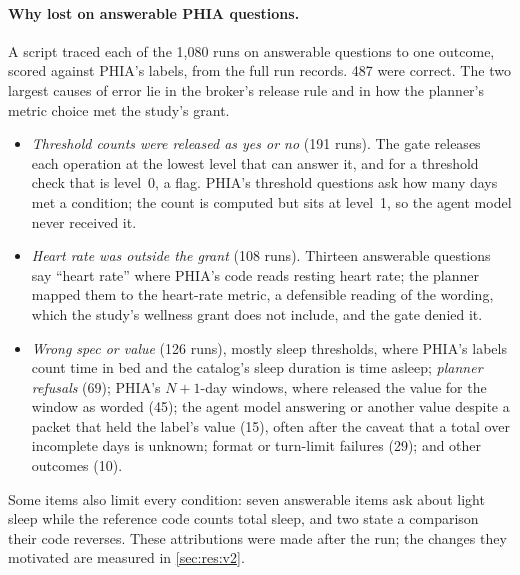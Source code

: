 \paragraph{Why \sys{} lost on answerable PHIA questions.} A script traced each of the 1{,}080 \CC{} runs on
answerable questions to one outcome, scored against PHIA's labels, from the full run records. 487 were correct. The two largest causes of
error lie in the broker's release rule and in how the planner's metric choice met the study's grant.
\begin{itemize}[nosep,leftmargin=*]
\item \emph{Threshold counts were released as yes or no} (191 runs). The gate releases each operation at the lowest
level that can answer it, and for a threshold check that is level~0, a flag. PHIA's threshold questions ask how many
days met a condition; the count is computed but sits at level~1, so the agent model never received it.
\item \emph{Heart rate was outside the grant} (108 runs). Thirteen answerable questions say ``heart rate'' where
PHIA's code reads resting heart rate; the planner mapped them to the heart-rate metric, a defensible reading of the
wording, which the study's wellness grant does not include, and the gate denied it.
\item \emph{Wrong spec or value} (126 runs), mostly sleep thresholds, where PHIA's labels count time in bed and the
catalog's sleep duration is time asleep; \emph{planner refusals} (69); PHIA's $N{+}1$-day windows, where \CC{}
released the value for the window as worded (45); the agent model answering  or another value despite
a packet that held the label's value (15), often after the caveat that a total over incomplete days is unknown; format or turn-limit failures (29); and other
outcomes (10).
\end{itemize}
Some items also limit every condition: seven answerable items ask about light sleep while the reference code counts
total sleep, and two state a comparison their code reverses. These attributions were made after the run; the changes they motivated are measured in \cref{sec:res:v2}.

